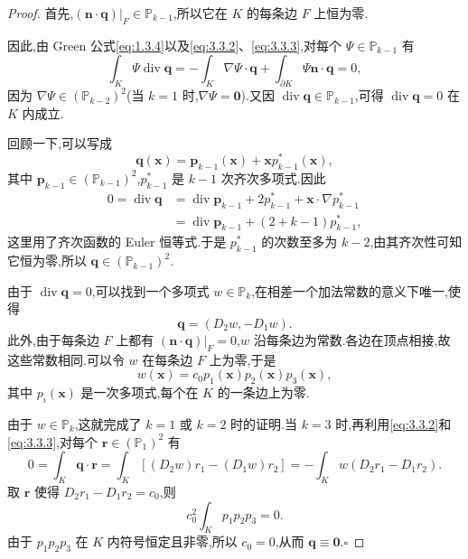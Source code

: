\begin{proof}
首先,\((\boldsymbol{n}\cdot\boldsymbol{q})|_F\in\mathbb P_{k-1}\),所以它在 \(K\) 的每条边 \(F\) 上恒为零.

因此,由 Green 公式\eqref{eq:1.3.4}以及\eqref{eq:3.3.2}、\eqref{eq:3.3.3},对每个 \(\Psi\in\mathbb P_{k-1}\) 有
\[
  \int_K\Psi\operatorname{div}\boldsymbol{q}
  =-\int_K\nabla\Psi\cdot\boldsymbol{q}+\int_{\partial K}\Psi\boldsymbol{n}\cdot\boldsymbol{q}
  =0,
\]
因为 \(\nabla\Psi\in(\mathbb P_{k-2})^2\)(当 \(k=1\) 时,\(\nabla\Psi=\boldsymbol{0}\)).又因 \(\operatorname{div}\boldsymbol{q}\in\mathbb P_{k-1}\),可得 \(\operatorname{div}\boldsymbol{q}=0\) 在 \(K\) 内成立.

回顾一下,可以写成
\[
  \boldsymbol{q}(\boldsymbol{x})=\boldsymbol{p}_{k-1}(\boldsymbol{x})+\boldsymbol{x}p^*_{k-1}(\boldsymbol{x}),
\]
其中 \(\boldsymbol{p}_{k-1}\in(\mathbb P_{k-1})^2\),\(p^*_{k-1}\) 是 \(k-1\) 次齐次多项式.因此
\[
  \begin{aligned}
    0=\operatorname{div}\boldsymbol{q}
    &=\operatorname{div}\boldsymbol{p}_{k-1}+2p^*_{k-1}
       +\boldsymbol{x}\cdot\nabla p^*_{k-1}\\
    &=\operatorname{div}\boldsymbol{p}_{k-1}+(2+k-1)p^*_{k-1},
  \end{aligned}
\]
这里用了齐次函数的 Euler 恒等式.于是 \(p^*_{k-1}\) 的次数至多为 \(k-2\),由其齐次性可知它恒为零,所以 \(\boldsymbol{q}\in(\mathbb P_{k-1})^2\).

由于 \(\operatorname{div}\boldsymbol{q}=0\),可以找到一个多项式 \(w\in\mathbb P_k\),在相差一个加法常数的意义下唯一,使得
\[
  \boldsymbol{q}=(D_2w,-D_1w).
\]
此外,由于每条边 \(F\) 上都有 \((\boldsymbol{n}\cdot\boldsymbol{q})|_F=0\),\(w\) 沿每条边为常数.各边在顶点相接,故这些常数相同.可以令 \(w\) 在每条边 \(F\) 上为零,于是
\[
  w(\boldsymbol{x})=c_0p_1(\boldsymbol{x})p_2(\boldsymbol{x})p_3(\boldsymbol{x}),
\]
其中 \(p_i(\boldsymbol{x})\) 是一次多项式,每个在 \(K\) 的一条边上为零.

由于 \(w\in\mathbb P_k\),这就完成了 \(k=1\) 或 \(k=2\) 时的证明.当 \(k=3\) 时,再利用\eqref{eq:3.3.2}和\eqref{eq:3.3.3},对每个 \(\boldsymbol{r}\in(\mathbb P_1)^2\) 有
\[
  0=\int_K\boldsymbol{q}\cdot\boldsymbol{r}
    =\int_K[(D_2w)r_1-(D_1w)r_2]
    =-\int_Kw(D_2r_1-D_1r_2).
\]
取 \(\boldsymbol{r}\) 使得 \(D_2r_1-D_1r_2=c_0\),则
\[
  c_0^2\int_K p_1p_2p_3=0.
\]
由于 \(p_1p_2p_3\) 在 \(K\) 内符号恒定且非零,所以 \(c_0=0\),从而 \(\boldsymbol{q}\equiv\boldsymbol{0}\).\hfill\(\square\)
\end{proof}

